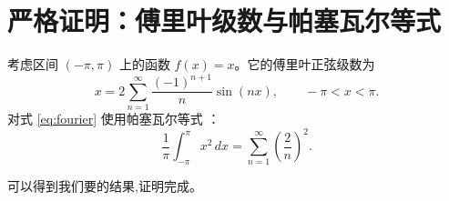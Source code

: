 \section{严格证明：傅里叶级数与帕塞瓦尔等式}

考虑区间 $(-\pi,\pi)$ 上的函数 $f(x)=x$。它的傅里叶正弦级数为
\begin{equation}
  x=2\sum_{n=1}^{\infty}\frac{(-1)^{n+1}}{n}\sin(nx),
  \qquad -\pi<x<\pi .
  \label{eq:fourier}
\end{equation}
对式 \eqref{eq:fourier} 使用帕塞瓦尔等式 \cite{apostol}：
\begin{equation}
  \frac{1}{\pi}\int_{-\pi}^{\pi}x^2\,dx
  =\sum_{n=1}^{\infty}\left(\frac{2}{n}\right)^2.
  \label{eq:parseval}
\end{equation}

可以得到我们要的结果,证明完成。
